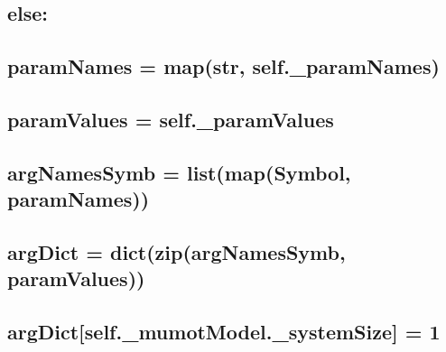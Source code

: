 \subsection*{else\+:}

\subsection*{param\+Names = map(str, self.\+\_\+param\+Names)}

\subsection*{param\+Values = self.\+\_\+param\+Values}

\subsection*{}

\subsection*{arg\+Names\+Symb = list(map(\+Symbol, param\+Names))}

\subsection*{arg\+Dict = dict(zip(arg\+Names\+Symb, param\+Values))}

\subsection*{arg\+Dict\mbox{[}self.\+\_\+mumot\+Model.\+\_\+system\+Size\mbox{]} = 1}

